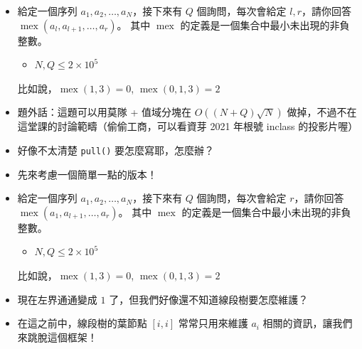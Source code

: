 \documentclass[standalone]{beamer}
\begin{document}
\begin{frame}[fragile]{}
  \begin{itemize}
    \item 
      \begin{problem}[區間 mex]
        給定一個序列 $a_1,a_2,\dots,a_N$，接下來有 $Q$ 個詢問，每次會給定 $l, r$，請你回答 $\operatorname{mex}(a_l,a_{l+1},\dots,a_r)$。
        其中 $\operatorname{mex}$ 的定義是一個集合中最小未出現的非負整數。

        \begin{itemize}
            \item
                $N, Q \leq 2\times 10^5$
        \end{itemize}

        比如說，$\operatorname{mex}(1, 3) = 0$, $\operatorname{mex}(0, 1, 3) = 2$
      \end{problem}
    \item 題外話：這題可以用莫隊 + 值域分塊在 $O((N + Q)\sqrt{N})$ 做掉，不過不在這堂課的討論範疇（偷偷工商，可以看資芽 2021 年根號 inclass 的投影片喔）
    \item 好像不太清楚 \texttt{pull()} 要怎麼寫耶，怎麼辦？
    \item 先來考慮一個簡單一點的版本！
  \end{itemize}
\end{frame}

\begin{frame}[fragile]{}
  \begin{itemize}
    \item 
      \begin{problem}
        給定一個序列 $a_1,a_2,\dots,a_N$，接下來有 $Q$ 個詢問，每次會給定 $r$，請你回答 $\operatorname{mex}(a_1,a_{l+1},\dots,a_r)$。
        其中 $\operatorname{mex}$ 的定義是一個集合中最小未出現的非負整數。

        \begin{itemize}
            \item
                $N, Q \leq 2\times 10^5$
        \end{itemize}

        比如說，$\operatorname{mex}(1, 3) = 0$, $\operatorname{mex}(0, 1, 3) = 2$
      \end{problem}
    \item 現在左界通通變成 $1$ 了，但我們好像還不知道線段樹要怎麼維護？
    \item 在這之前中，線段樹的葉節點 $[i, i]$ 常常只用來維護 $a_i$ 相關的資訊，讓我們來跳脫這個框架！ 
  \end{itemize}
\end{frame}
\end{document}
